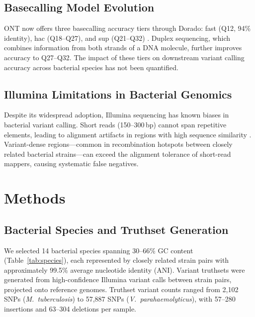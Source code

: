 \documentclass[11pt]{article}
\begin{document}
\subsection{Basecalling Model Evolution}

ONT now offers three basecalling accuracy tiers through Dorado: fast (Q12, 94\% identity), hac (Q18--Q27), and sup (Q21--Q32) \citep{wick2023}. Duplex sequencing, which combines information from both strands of a DNA molecule, further improves accuracy to Q27--Q32. The impact of these tiers on downstream variant calling accuracy across bacterial species has not been quantified.

\subsection{Illumina Limitations in Bacterial Genomics}

Despite its widespread adoption, Illumina sequencing has known biases in bacterial variant calling. Short reads (150--300\,bp) cannot span repetitive elements, leading to alignment artifacts in regions with high sequence similarity \citep{treangen2012}. Variant-dense regions---common in recombination hotspots between closely related bacterial strains---can exceed the alignment tolerance of short-read mappers, causing systematic false negatives.

\section{Methods}

\subsection{Bacterial Species and Truthset Generation}

We selected 14 bacterial species spanning 30--66\% GC content (Table~\ref{tab:species}), each represented by closely related strain pairs with approximately 99.5\% average nucleotide identity (ANI). Variant truthsets were generated from high-confidence Illumina variant calls between strain pairs, projected onto reference genomes. Truthset variant counts ranged from 2,102 SNPs (\textit{M.~tuberculosis}) to 57,887 SNPs (\textit{V.~parahaemolyticus}), with 57--280 insertions and 63--304 deletions per sample.
\end{document}
